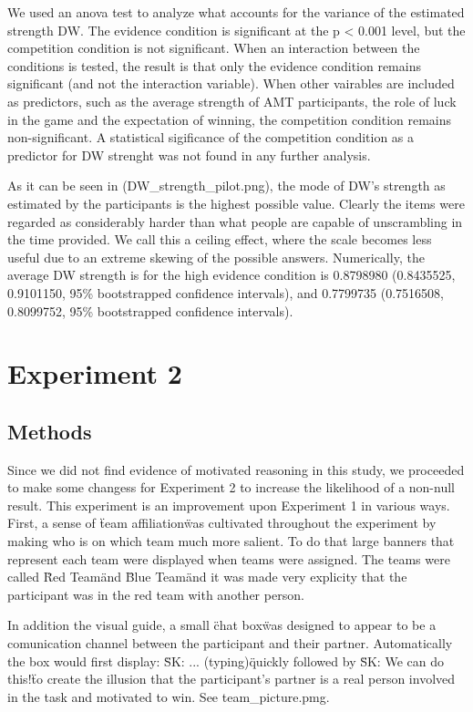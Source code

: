 \documentclass{article}
\begin{document}
We used an anova test to analyze what accounts for the variance of the estimated strength DW. The evidence condition is significant at the p < 0.001 level, but the competition condition is not significant. When an interaction between the conditions is tested, the result is that only the evidence condition remains significant (and not the interaction variable). When other vairables are included as predictors, such as the average strength of AMT participants, the role of luck in the game and the expectation of winning, the competition condition remains non-significant. A statistical sigificance of the competition condition as a predictor for DW strenght was not found in any further analysis.

As it can be seen in (DW_strength_pilot.png), the mode of DW's strength as estimated by the participants is the highest possible value. Clearly the items were regarded as considerably harder than what people are capable of unscrambling in the time provided. We call this a ceiling effect, where the scale becomes less useful due to an extreme skewing of the possible answers. Numerically, the average DW strength is for the high evidence condition is 0.8798980 (0.8435525, 0.9101150, 95\% bootstrapped confidence intervals), and 0.7799735 (0.7516508, 0.8099752, 95\% bootstrapped confidence intervals).

\section{Experiment 2}

\subsection{Methods}


Since we did not find evidence of motivated reasoning in this study, we proceeded to make some changess for Experiment 2 to increase the likelihood of a non-null result. This experiment is an improvement upon Experiment 1 in various ways. First, a sense of \"team affiliation\" was cultivated throughout the experiment by making who is on which team much more salient. To do that large banners that represent each team were displayed when teams were assigned. The teams were called \"Red Team\" and \"Blue Team\" and it was made very explicity that the participant was in the red team with another person. 

In addition the visual guide, a small \"chat box\" was designed to appear to be a comunication channel between the participant and their partner. Automatically the box would first display: \"SK: ... (typing)\" quickly followed by \"SK: We can do this!\" to create the illusion that the participant's partner is a real person involved in the task and motivated to win. See team_picture.pmg.
\end{document}
